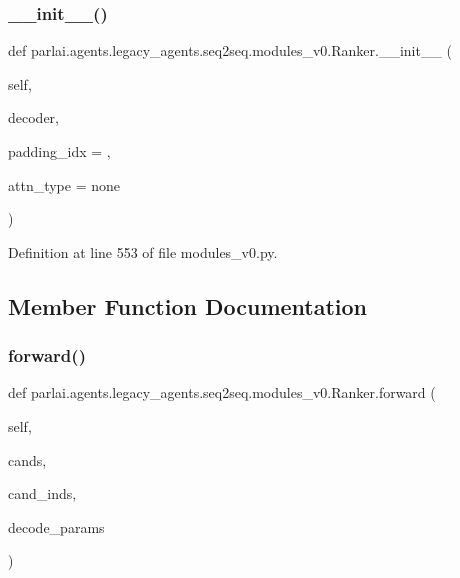 \subsubsection{\texorpdfstring{\+\_\+\+\_\+init\+\_\+\+\_\+()}{\_\_init\_\_()}}
{\footnotesize\ttfamily def parlai.\+agents.\+legacy\+\_\+agents.\+seq2seq.\+modules\+\_\+v0.\+Ranker.\+\_\+\+\_\+init\+\_\+\+\_\+ (\begin{DoxyParamCaption}\item[{}]{self,  }\item[{}]{decoder,  }\item[{}]{padding\+\_\+idx = {},  }\item[{}]{attn\+\_\+type = {\ttfamily \textquotesingle{}none\textquotesingle{}} }\end{DoxyParamCaption})}



Definition at line 553 of file modules\+\_\+v0.\+py.



\subsection{Member Function Documentation}
\mbox{\label{classparlai_1_1agents_1_1legacy__agents_1_1seq2seq_1_1modules__v0_1_1Ranker_a48177b131d765ebd734d25f962c44f55}} 
\subsubsection{\texorpdfstring{forward()}{forward()}}
{\footnotesize\ttfamily def parlai.\+agents.\+legacy\+\_\+agents.\+seq2seq.\+modules\+\_\+v0.\+Ranker.\+forward (\begin{DoxyParamCaption}\item[{}]{self,  }\item[{}]{cands,  }\item[{}]{cand\+\_\+inds,  }\item[{}]{decode\+\_\+params }\end{DoxyParamCaption})}



